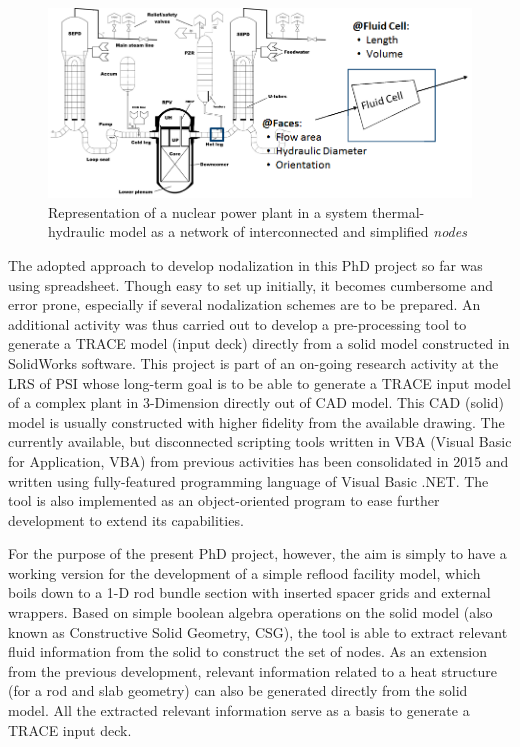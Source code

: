 \documentclass[11pt,titlepage]{article}
\begin{document}
\begin{figure}[h!]
	\centering
	\includegraphics[scale=0.60]{figures/nodalization.png}
	\caption{Representation of a nuclear power plant in a system thermal-hydraulic model as a network of interconnected and simplified \emph{nodes}}
	\label{fig:nodalization}
\end{figure}

The adopted approach to develop nodalization in this PhD project so far was using spreadsheet. 
Though easy to set up initially, it becomes cumbersome and error prone, especially if several nodalization schemes are to be prepared.
An additional activity was thus carried out to develop a pre-processing tool to generate a TRACE model (input deck) directly from a solid model constructed in SolidWorks software.
This project is part of an on-going research activity at the LRS of PSI whose long-term goal is to be able to generate a TRACE input model of a complex plant in 3-Dimension directly out of CAD model.
This CAD (solid) model is usually constructed with higher fidelity from the available drawing.
The currently available, but disconnected scripting tools written in VBA (Visual Basic for Application, VBA) from previous activities has been consolidated in 2015 and 
written using fully-featured programming language of Visual Basic .NET.
The tool is also implemented as an object-oriented program to ease further development to extend its capabilities.

For the purpose of the present PhD project, however, the aim is simply to have a working 
version for the development of a simple reflood facility model, 
which boils down to a 1-D rod bundle section with inserted spacer grids and external wrappers.
Based on simple boolean algebra operations on the solid model 
(also known as Constructive Solid Geometry, CSG), the tool is able to 
extract relevant fluid information from the solid to construct the set of nodes.
As an extension from the previous development, relevant information related to
a heat structure (for a rod and slab geometry) can also be generated directly 
from the solid model. 
All the extracted relevant information serve as a basis to generate a TRACE input deck. 
\end{document}
